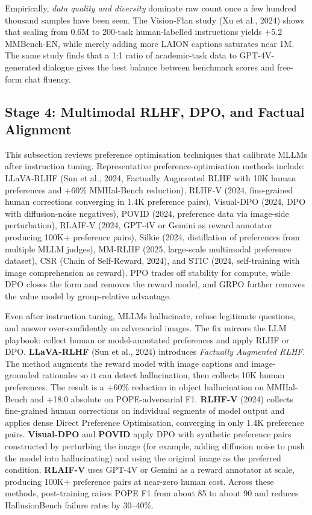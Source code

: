 Empirically, \emph{data quality and diversity} dominate raw count once a few hundred thousand samples have been seen. The Vision-Flan study (Xu et al., 2024) shows that scaling from 0.6M to 200-task human-labelled instructions yields +5.2 MMBench-EN, while merely adding more LAION captions saturates near 1M. The same study finds that a 1:1 ratio of academic-task data to GPT-4V-generated dialogue gives the best balance between benchmark scores and free-form chat fluency.

\subsection{Stage 4: Multimodal RLHF, DPO, and Factual Alignment}\label{stage-4-multimodal-rlhf-dpo-and-factual-alignment}

This subsection reviews preference optimisation techniques that calibrate MLLMs after instruction tuning. Representative preference-optimisation methods include: LLaVA-RLHF (Sun et al., 2024, Factually Augmented RLHF with 10K human preferences and +60\% MMHal-Bench reduction), RLHF-V (2024, fine-grained human corrections converging in 1.4K preference pairs), Visual-DPO (2024, DPO with diffusion-noise negatives), POVID (2024, preference data via image-side perturbation), RLAIF-V (2024, GPT-4V or Gemini as reward annotator producing 100K+ preference pairs), Silkie (2024, distillation of preferences from multiple MLLM judges), MM-RLHF (2025, large-scale multimodal preference dataset), CSR (Chain of Self-Reward, 2024), and STIC (2024, self-training with image comprehension as reward). PPO trades off stability for compute, while DPO closes the form and removes the reward model, and GRPO further removes the value model by group-relative advantage.

Even after instruction tuning, MLLMs hallucinate, refuse legitimate questions, and answer over-confidently on adversarial images. The fix mirrors the LLM playbook: collect human or model-annotated preferences and apply RLHF or DPO. \textbf{LLaVA-RLHF} (Sun et al., 2024) introduces \emph{Factually Augmented RLHF}. The method augments the reward model with image captions and image-grounded rationales so it can detect hallucination, then collects 10K human preferences. The result is a +60\% reduction in object hallucination on MMHal-Bench and +18.0 absolute on POPE-adversarial F1. \textbf{RLHF-V} (2024) collects fine-grained human corrections on individual segments of model output and applies dense Direct Preference Optimisation, converging in only 1.4K preference pairs. \textbf{Visual-DPO} and \textbf{POVID} apply DPO with synthetic preference pairs constructed by perturbing the image (for example, adding diffusion noise to push the model into hallucinating) and using the original image as the preferred condition. \textbf{RLAIF-V} uses GPT-4V or Gemini as a reward annotator at scale, producing 100K+ preference pairs at near-zero human cost. Across these methods, post-training raises POPE F1 from about 85 to about 90 and reduces HallusionBench failure rates by 30--40\%.

